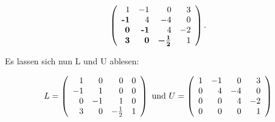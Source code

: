 \documentclass[12pt]{article}
\begin{document}
$$
\left(
	\begin{array}{r r r r}
		 1	 	&	 -1		&	  0		&	 3	\\
		\textbf{-1}		&	  4		&	 -4		&	 0	\\
		 \textbf{0}	 	&	 \textbf{-1}		&	  4		&	-2	\\
		 \textbf{3}	 	&	 \textbf{0}		&	 \boldsymbol{-\frac{1}{2} }		&	 1	\\
	\end{array}
\right ) .
$$

Es lassen sich nun L und U ablesen:

$$
L = \left ( \begin{array}{r r r r} 
 1	&	 0	& 0 & 0 \\
-1  &  1  & 0 & 0 \\
 0  & -1  & 1 & 0 \\ 
 3  &  0  & -\frac{1}{2} & 1 \\ 
\end{array}  \right ) \text{ und } U = 
\left ( \begin{array}{r r r r} 
 1	&	 -1	 &  0 &  3 \\
 0  &   4  & -4 &  0 \\
 0  &   0  &  4 & -2 \\ 
 0  &   0  &  0 &  1 \\ 
\end{array}  \right ) 
$$









\end{document}

